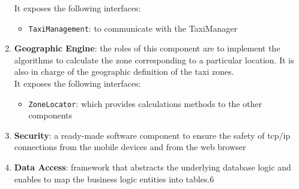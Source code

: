 \begin{enumerate}
	It exposes the following interfaces:
	\begin{itemize}
		\item \texttt{TaxiManagement}: to communicate with the TaxiManager
	\end{itemize}
	\item \textbf{Geographic Engine}: the roles of this component are to implement the algorithms to calculate the zone corresponding to a particular location. It is also in charge of the geographic definition of the taxi zones.\\It exposes the following interfaces:
	\begin{itemize}
		\item \texttt{ZoneLocator}: which provides calculations methods to the other components
	\end{itemize}
	\item \textbf{Security}: a ready-made software component to ensure the safety of tcp/ip connections from the mobile devices and from the web browser
	\item \textbf{Data Access}: framework that abstracts the underlying database logic and enables to map the business logic entities into tables.6
\end{enumerate}